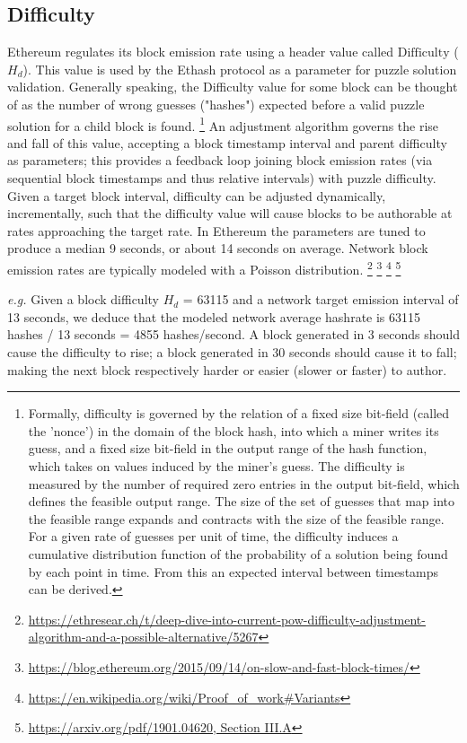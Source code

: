 \documentclass[11pt]{article}
\theoremstyle{plain}
\begin{document}
\subsection{\small{Difficulty}}
Ethereum regulates its block emission rate using a header value called
$\mathrm{Difficulty}$ ($H_d$). This value is used by the Ethash protocol as a
parameter for puzzle solution validation. Generally speaking, the Difficulty
value for some block can be thought of as the number of wrong guesses
("hashes") expected before a valid puzzle solution for a child block is
found.\nolinebreak
\footnote{Formally, difficulty is governed by the relation of a fixed size
bit-field (called the 'nonce') in the domain of the block hash, into which a 
miner writes its guess, and a fixed size bit-field in the output range of the 
hash function, which takes on values induced by the miner's guess. The 
difficulty is measured by the number of required zero entries in the output  
bit-field, which defines the feasible output range.  The size of the set of 
guesses that map into the feasible range expands and contracts with the size of 
the feasible range. For a given rate of guesses per unit of time, the 
difficulty induces a cumulative distribution function of the probability of a 
solution being found by each point in time. From this an expected interval 
between timestamps can be derived.}
An adjustment algorithm governs the rise and fall of this value, accepting a 
block timestamp interval and parent difficulty as parameters;
this provides a feedback loop joining block emission rates (via sequential 
block timestamps and thus relative intervals) with puzzle difficulty.
Given a target block interval, difficulty can be adjusted dynamically, 
incrementally, such that the difficulty value will cause blocks to be authorable
at rates approaching the target rate.
In Ethereum the parameters are tuned to produce a median 9 seconds, or about 14
seconds on average.
Network block emission rates are typically modeled with a Poisson
distribution.\nolinebreak
\footnote{\url{https://ethresear.ch/t/deep-dive-into-current-pow-difficulty-adjustment-algorithm-and-a-possible-alternative/5267}}\nolinebreak
\footnote{\url{https://blog.ethereum.org/2015/09/14/on-slow-and-fast-block-times/}}\nolinebreak
\footnote{\url{https://en.wikipedia.org/wiki/Proof_of_work#Variants}}\nolinebreak
\footnote{\url{https://arxiv.org/pdf/1901.04620, Section III.A}}

\textit{e.g.} Given a block difficulty $H_d$ = 63115 and a network target
emission interval of 13 seconds, we deduce that the modeled network average
hashrate is 63115 hashes / 13 seconds = 4855 hashes/second. A block generated
in 3 seconds should cause the difficulty to rise; a block generated in 30
seconds should cause it to fall; making the next block respectively harder or
easier (slower or faster) to author.
\end{document}
